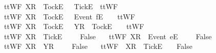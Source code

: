 \ \ {\isachardoublequoteopen}ttWF{}\ {\isacharparenleft}{\isacharbrackleft}X{\isacharbrackright}\isactrlsub R\ {\isacharhash}\ {\isacharbrackleft}Tock{\isacharbrackright}\isactrlsub E\ {\isacharhash}\ {\isasymsigma}{\isacharparenright}\ {\isacharbrackleft}{\isacharbrackleft}Tick{\isacharbrackright}\isactrlsub E{\isacharbrackright}\ {\isacharequal}\ ttWF{}\ {\isasymsigma}\ {\isacharbrackleft}{\isacharbrackright}{\isachardoublequoteclose}\ {\isacharbar}\ \isanewline
\ \ {\isachardoublequoteopen}ttWF{}\ {\isacharparenleft}{\isacharbrackleft}X{\isacharbrackright}\isactrlsub R\ {\isacharhash}\ {\isacharbrackleft}Tock{\isacharbrackright}\isactrlsub E\ {\isacharhash}\ {\isasymrho}{\isacharparenright}\ {\isacharparenleft}{\isacharbrackleft}Event\ f{\isacharbrackright}\isactrlsub E\ {\isacharhash}\ {\isasymsigma}{\isacharparenright}\ {\isacharequal}\ ttWF{}\ {\isasymrho}\ {\isasymsigma}{\isachardoublequoteclose}\ {\isacharbar}\ \isanewline
\ \ {\isachardoublequoteopen}ttWF{}\ {\isacharparenleft}{\isacharbrackleft}X{\isacharbrackright}\isactrlsub R\ {\isacharhash}\ {\isacharbrackleft}Tock{\isacharbrackright}\isactrlsub E\ {\isacharhash}\ {\isasymrho}{\isacharparenright}\ {\isacharparenleft}{\isacharbrackleft}Y{\isacharbrackright}\isactrlsub R\ {\isacharhash}\ {\isacharbrackleft}Tock{\isacharbrackright}\isactrlsub E\ {\isacharhash}\ {\isasymsigma}{\isacharparenright}\ {\isacharequal}\ ttWF{}\ {\isasymrho}\ {\isasymsigma}{\isachardoublequoteclose}\ {\isacharbar}\isanewline
\ \ {\isachardoublequoteopen}ttWF{}\ {\isacharparenleft}{\isacharbrackleft}X{\isacharbrackright}\isactrlsub R\ {\isacharhash}\ {\isacharbrackleft}Tick{\isacharbrackright}\isactrlsub E\ {\isacharhash}\ {\isasymrho}{\isacharparenright}\ {\isasymsigma}\ {\isacharequal}\ False{\isachardoublequoteclose}\ {\isacharbar}\isanewline
\ \ {\isachardoublequoteopen}ttWF{}\ {\isacharparenleft}{\isacharbrackleft}X{\isacharbrackright}\isactrlsub R\ {\isacharhash}\ {\isacharbrackleft}Event\ e{\isacharbrackright}\isactrlsub E\ {\isacharhash}\ {\isasymrho}{\isacharparenright}\ {\isasymsigma}\ {\isacharequal}\ False{\isachardoublequoteclose}\ {\isacharbar}\isanewline
\ \ {\isachardoublequoteopen}ttWF{}\ {\isacharparenleft}{\isacharbrackleft}X{\isacharbrackright}\isactrlsub R\ {\isacharhash}\ {\isacharbrackleft}Y{\isacharbrackright}\isactrlsub R\ {\isacharhash}\ {\isasymrho}{\isacharparenright}\ {\isasymsigma}\ {\isacharequal}\ False{\isachardoublequoteclose}\ {\isacharbar}\isanewline
\ \ {\isachardoublequoteopen}ttWF{}\ {\isasymrho}\ {\isacharparenleft}{\isacharbrackleft}X{\isacharbrackright}\isactrlsub R\ {\isacharhash}\ {\isacharbrackleft}Tick{\isacharbrackright}\isactrlsub E\ {\isacharhash}\ {\isasymsigma}{\isacharparenright}\ {\isacharequal}\ False{\isachardoublequoteclose}\ {\isacharbar}\isanewline
